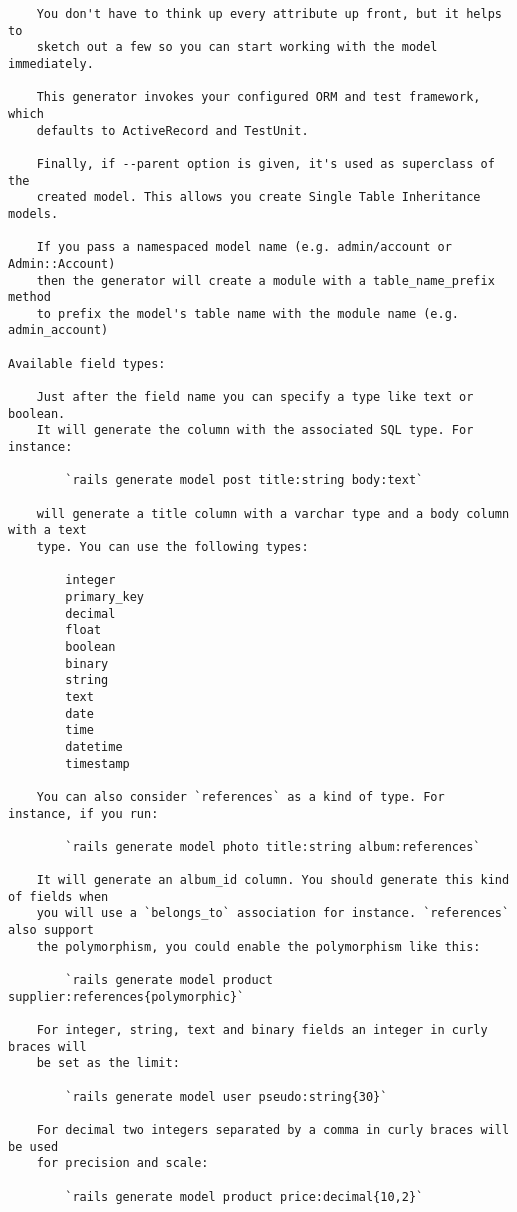 \documentclass[a4paper]{book}
\newcounter{tab}[chapter]
\begin{document}
\begin{shaded}
\begin{verbatim}
    You don't have to think up every attribute up front, but it helps to
    sketch out a few so you can start working with the model immediately.

    This generator invokes your configured ORM and test framework, which
    defaults to ActiveRecord and TestUnit.

    Finally, if --parent option is given, it's used as superclass of the
    created model. This allows you create Single Table Inheritance models.

    If you pass a namespaced model name (e.g. admin/account or Admin::Account)
    then the generator will create a module with a table_name_prefix method
    to prefix the model's table name with the module name (e.g. admin_account)

Available field types:

    Just after the field name you can specify a type like text or boolean.
    It will generate the column with the associated SQL type. For instance:

        `rails generate model post title:string body:text`

    will generate a title column with a varchar type and a body column with a text
    type. You can use the following types:

        integer
        primary_key
        decimal
        float
        boolean
        binary
        string
        text
        date
        time
        datetime
        timestamp

    You can also consider `references` as a kind of type. For instance, if you run:

        `rails generate model photo title:string album:references`

    It will generate an album_id column. You should generate this kind of fields when
    you will use a `belongs_to` association for instance. `references` also support
    the polymorphism, you could enable the polymorphism like this:

        `rails generate model product supplier:references{polymorphic}`

    For integer, string, text and binary fields an integer in curly braces will
    be set as the limit:

        `rails generate model user pseudo:string{30}`

    For decimal two integers separated by a comma in curly braces will be used
    for precision and scale:

        `rails generate model product price:decimal{10,2}`


\end{verbatim}
\end{shaded}
\end{document}
